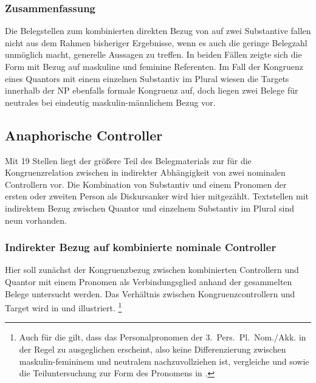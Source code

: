\subsubsection{Zusammenfassung}

Die Belegstellen zum kombinierten direkten Bezug von \mbox{} auf
zwei Substantive fallen nicht aus dem Rahmen bisheriger Ergebnisse, wenn es
auch die geringe Belegzahl unmöglich macht, generelle Aussagen zu treffen. In
beiden Fällen zeigte sich die Form  mit Bezug auf maskuline und
feminine Referenten. Im Fall der Kongruenz eines Quantors mit einem einzelnen
Substantiv im Plural wiesen die Targets innerhalb der NP ebenfalls formale
Kongruenz auf, doch liegen zwei Belege für neutrales  bei
eindeutig maskulin-männlichem Bezug vor.

\subsection{Anaphorische Controller}

Mit 19 Stellen liegt der größere Teil des Belegmaterials zur \KC{} für die
Kongruenzrelation zwischen  in indirekter Abhängigkeit von zwei
nominalen Controllern vor. Die Kombination von Substantiv und einem Pronomen
der ersten oder zweiten Person als Diskurs\-anker wird hier mitgezählt.
Textstellen mit indirektem Bezug zwischen Quantor und einzelnem Substantiv im
Plural sind neun vorhanden.

\subsubsection{Indirekter Bezug auf kombinierte nominale Controller}
\label{subsubssec:iconomctrlpers}

Hier soll zunächst der Kongruenzbezug zwischen kombinierten Controllern und
Quantor mit einem Pronomen als Verbindungsglied anhand der gesammelten Belege
untersucht werden. Das Verhältnis zwischen Kongruenzcontrollern und Target wird
in  und  illustriert.%
%
	\footnote{Auch für die \KC{} gilt, dass das Personalpronomen der
		3.~Pers.\ Pl.\ Nom./Akk. in der Regel zu  ausgeglichen
		erscheint, also keine Differenzierung zwischen maskulin-femininem
		 und neutralem  nachzuvollziehen ist, vergleiche
		\citet[213--214]{paul2007} und \citet[369, 390--397]{ksw2} sowie die
		Teiluntersuchung zur Form des Pronomens in
		.}

